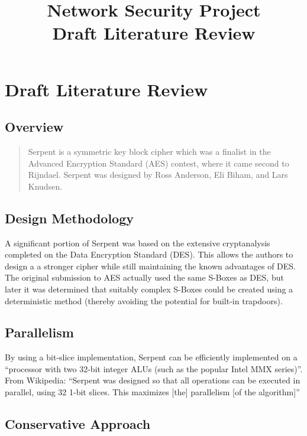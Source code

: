 \documentclass{article}
\title{Network Security Project\\ Draft Literature Review}
\begin{document}
\maketitle

\section{Draft Literature Review}

\subsection{Overview}

\blockquote{Serpent is a symmetric key block cipher which was a finalist in the Advanced Encryption Standard (AES) contest, where it came second to Rijndael. Serpent was designed by Ross Anderson, Eli Biham, and Lars Knudsen.}\cite{wikipedia}

\subsection{Design Methodology}

A significant portion of Serpent was based on the extensive cryptanalysis completed on the Data Encryption Standard (DES). \cite{submission} This allows the authors to design a a stronger cipher while still maintaining the known advantages of DES. The original submission to AES actually used the same S-Boxes as DES\cite[5]{submission}, but later it was determined that suitably complex S-Boxes could be created using a deterministic method (thereby avoiding the potential for built-in trapdoors). \cite[7, 15]{submission}

\subsection{Parallelism}

By using a bit-slice implementation, Serpent can be efficiently implemented on a \enquote{processor with two 32-bit integer ALUs (such as the popular Intel MMX series)}.\cite[2]{submission} From Wikipedia: \enquote{Serpent was designed so that all operations can be executed in parallel, using 32 1-bit slices. This maximizes [the] parallelism [of the algorithm]}\cite{wikipedia}

\subsection{Conservative Approach}
\end{document}
